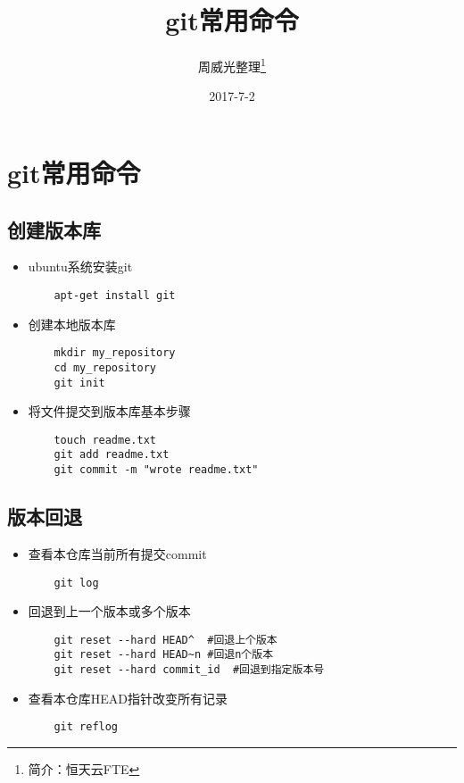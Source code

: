 \documentclass[a4paper,left=1.5cm,right=1.5cm,11pt]{article}
\title{git常用命令}
\author{周威光整理\footnote{简介：恒天云FTE}}
\date{2017-7-2}
\begin{document}
\maketitle
\clearpage
\tableofcontents
\clearpage
\section{git常用命令}
\subsection{创建版本库}
\begin{itemize}
	\item[1.]ubuntu系统安装git
	\begin{lstlisting}
	apt-get install git
	\end{lstlisting}
	\item[2.]创建本地版本库
	\begin{lstlisting}
	mkdir my_repository
	cd my_repository
	git init
	\end{lstlisting}
	\item[3]将文件提交到版本库基本步骤
	\begin{lstlisting}
	touch readme.txt
	git add readme.txt
	git commit -m "wrote readme.txt"
	\end{lstlisting}
\end{itemize}
\subsection{版本回退}
\begin{itemize}
	\item[1.]查看本仓库当前所有提交commit
	\begin{lstlisting}
	git log
	\end{lstlisting}
	\item[2.]回退到上一个版本或多个版本
	\begin{lstlisting}
	git reset --hard HEAD^  #回退上个版本
	git reset --hard HEAD~n #回退n个版本
	git reset --hard commit_id  #回退到指定版本号
	\end{lstlisting}
	\item[3.]查看本仓库HEAD指针改变所有记录
	\begin{lstlisting}
	git reflog
	\end{lstlisting}
\end{itemize}
\end{document}
